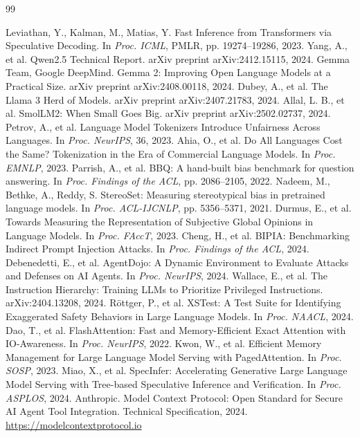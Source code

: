 \documentclass[10pt,a4paper,twocolumn]{article}
\begin{document}
\begin{thebibliography}{99}
\begin{singlespace}
 Leviathan, Y., Kalman, M., Matias, Y. Fast Inference from Transformers via Speculative Decoding. In \emph{Proc. ICML}, PMLR, pp. 19274--19286, 2023.
 Yang, A., et al. Qwen2.5 Technical Report. arXiv preprint arXiv:2412.15115, 2024.
 Gemma Team, Google DeepMind. Gemma 2: Improving Open Language Models at a Practical Size. arXiv preprint arXiv:2408.00118, 2024.
 Dubey, A., et al. The Llama 3 Herd of Models. arXiv preprint arXiv:2407.21783, 2024.
 Allal, L. B., et al. SmolLM2: When Small Goes Big. arXiv preprint arXiv:2502.02737, 2024.
 Petrov, A., et al. Language Model Tokenizers Introduce Unfairness Across Languages. In \emph{Proc. NeurIPS}, 36, 2023.
 Ahia, O., et al. Do All Languages Cost the Same? Tokenization in the Era of Commercial Language Models. In \emph{Proc. EMNLP}, 2023.
 Parrish, A., et al. BBQ: A hand-built bias benchmark for question answering. In \emph{Proc. Findings of the ACL}, pp. 2086--2105, 2022.
 Nadeem, M., Bethke, A., Reddy, S. StereoSet: Measuring stereotypical bias in pretrained language models. In \emph{Proc. ACL-IJCNLP}, pp. 5356--5371, 2021.
 Durmus, E., et al. Towards Measuring the Representation of Subjective Global Opinions in Language Models. In \emph{Proc. FAccT}, 2023.
 Cheng, H., et al. BIPIA: Benchmarking Indirect Prompt Injection Attacks. In \emph{Proc. Findings of the ACL}, 2024.
 Debenedetti, E., et al. AgentDojo: A Dynamic Environment to Evaluate Attacks and Defenses on AI Agents. In \emph{Proc. NeurIPS}, 2024.
 Wallace, E., et al. The Instruction Hierarchy: Training LLMs to Prioritize Privileged Instructions. arXiv:2404.13208, 2024.
 R\"ottger, P., et al. XSTest: A Test Suite for Identifying Exaggerated Safety Behaviors in Large Language Models. In \emph{Proc. NAACL}, 2024.
 Dao, T., et al. FlashAttention: Fast and Memory-Efficient Exact Attention with IO-Awareness. In \emph{Proc. NeurIPS}, 2022.
 Kwon, W., et al. Efficient Memory Management for Large Language Model Serving with PagedAttention. In \emph{Proc. SOSP}, 2023.
 Miao, X., et al. SpecInfer: Accelerating Generative Large Language Model Serving with Tree-based Speculative Inference and Verification. In \emph{Proc. ASPLOS}, 2024.
 Anthropic. Model Context Protocol: Open Standard for Secure AI Agent Tool Integration. Technical Specification, 2024. \url{https://modelcontextprotocol.io}

\end{singlespace}
\end{thebibliography}
\end{document}
